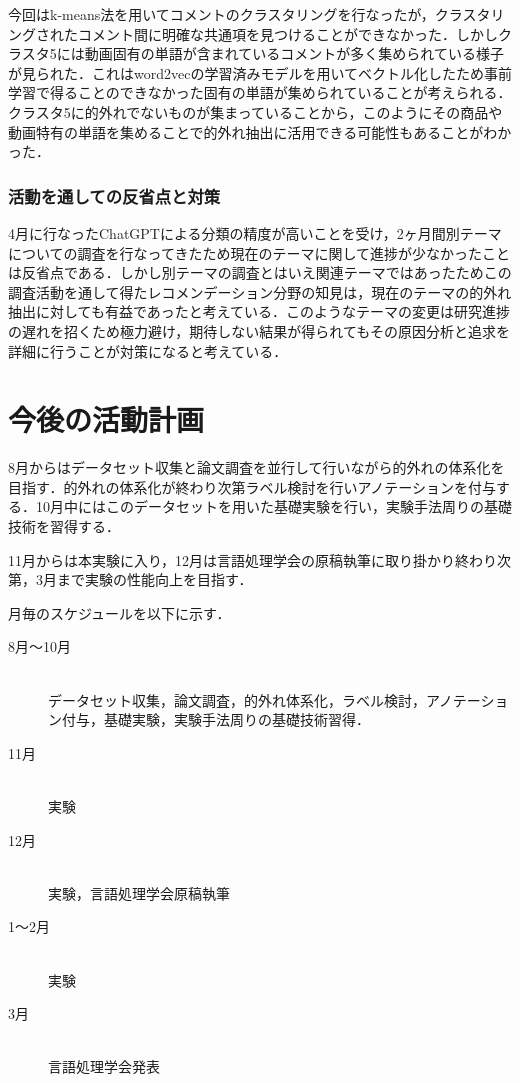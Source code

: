 \documentclass[platex,dvipdfmx,a4paper,twocolumn,base=10.5pt,jbase=10.5pt,ja=standard]{bxjsarticle}
\begin{document}
今回はk-means法を用いてコメントのクラスタリングを行なったが，クラスタリングされたコメント間に明確な共通項を見つけることができなかった．しかしクラスタ5には動画固有の単語が含まれているコメントが多く集められている様子が見られた．これはword2vecの学習済みモデルを用いてベクトル化したため事前学習で得ることのできなかった固有の単語が集められていることが考えられる．クラスタ5に的外れでないものが集まっていることから，このようにその商品や動画特有の単語を集めることで的外れ抽出に活用できる可能性もあることがわかった．
\subsubsection{活動を通しての反省点と対策}
4月に行なったChatGPTによる分類の精度が高いことを受け，2ヶ月間別テーマについての調査を行なってきたため現在のテーマに関して進捗が少なかったことは反省点である．しかし別テーマの調査とはいえ関連テーマではあったためこの調査活動を通して得たレコメンデーション分野の知見は，現在のテーマの的外れ抽出に対しても有益であったと考えている．このようなテーマの変更は研究進捗の遅れを招くため極力避け，期待しない結果が得られてもその原因分析と追求を詳細に行うことが対策になると考えている．
\section{今後の活動計画}
8月からはデータセット収集と論文調査を並行して行いながら的外れの体系化を目指す．的外れの体系化が終わり次第ラベル検討を行いアノテーションを付与する．10月中にはこのデータセットを用いた基礎実験を行い，実験手法周りの基礎技術を習得する．\par
11月からは本実験に入り，12月は言語処理学会の原稿執筆に取り掛かり終わり次第，3月まで実験の性能向上を目指す．\par
月毎のスケジュールを以下に示す．
\begin{description}
   
   \item[8月〜10月]\mbox{}\\
	    データセット収集，論文調査，的外れ体系化，ラベル検討，アノテーション付与，基礎実験，実験手法周りの基礎技術習得．
   \item[11月]\mbox{}\\
	    実験
    \item[12月]\mbox{}\\
           実験，言語処理学会原稿執筆
    \item[1〜2月]\mbox{}\\
           実験
    \item[3月]\mbox{}\\
           言語処理学会発表
\end{description}
\end{document}
